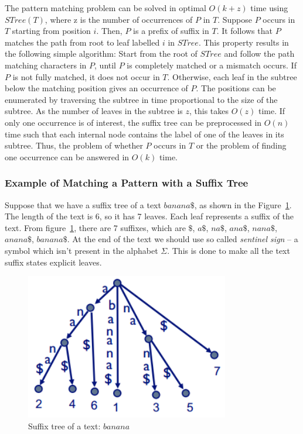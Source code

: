 \documentclass[paper=a4, fontsize=11pt]{scrartcl} %
\numberwithin{equation}{section} %
\numberwithin{figure}{section} %
\numberwithin{table}{section} %
\begin{document}
The pattern matching problem can be solved in optimal $O(k+z)$ time using $STree(T)$, where z is the number of occurrences of $P$ in $T$. Suppose $P$ occurs in $T$ starting from position $i$. Then, $P$ is a prefix of suffix in $T$. It follows that $P$ matches the path from root to leaf labelled $i$ in $STree$. This property results in the following simple algorithm: Start from the root of $STree$ and follow the path matching characters in $P$, until $P$ is completely matched or a mismatch occurs. If $P$ is not fully matched, it does not occur in $T$. Otherwise, each leaf in the subtree below the matching position gives an occurrence of $P$. The positions can be enumerated by traversing the subtree in time proportional to the size of the subtree. As the number of leaves in the subtree is $z$, this takes $O(z)$ time. If only one occurrence is of interest, the suffix tree can be preprocessed in $O(n)$ time such that each internal node contains the label of one of the leaves in its subtree. Thus, the problem of whether $P$ occurs in $T$ or the problem of finding one occurrence can be answered in $O(k)$ time.

\subsubsection{Example of Matching a Pattern with a Suffix Tree}
Suppose that we have a suffix tree of a text $banana\$$, as shown in the Figure~\ref{fig:suffix-tree-ex}. The length of the text is 6, so it has 7 leaves. Each leaf represents a suffix of the text. From figure~\ref{fig:suffix-tree-ex}, there are 7 suffixes, which are $\$$, $a\$$, $na\$$, $ana\$$, $nana\$$, $anana\$$, $banana\$$. At the end of the text we should use so called \textit{sentinel sign} -- a symbol which isn't present in the alphabet $\Sigma$. This is done to make all the text suffix states explicit leaves.

\begin{figure}
\centering
\includegraphics[width=3.5in]{figures/suffixtree.png}
\caption{Suffix tree of a text: $banana$}
\label{fig:suffix-tree-ex}
\end{figure}
\end{document}
